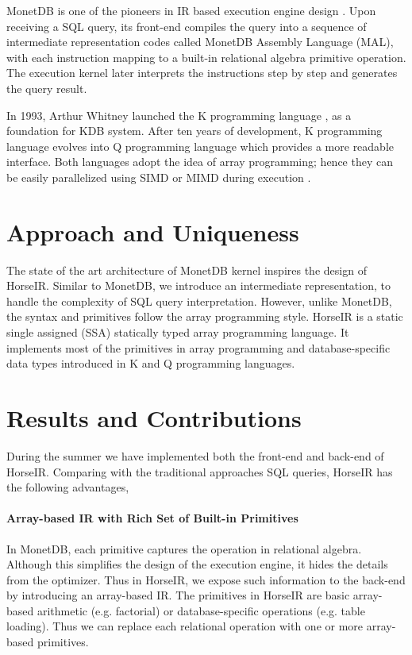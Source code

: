 \documentclass[sigplan]{acmart}
\begin{document}
MonetDB is one of the pioneers in IR based execution engine design
\cite{DBLP:journals/debu/IdreosGNMMK12}. Upon receiving a SQL query, its
front-end compiles the query into a sequence of intermediate representation
codes called MonetDB Assembly Language (MAL), with each instruction mapping to
a built-in relational algebra primitive operation. The execution kernel later
interprets the instructions step by step and generates the query result.

In 1993, Arthur Whitney launched the K programming language
\cite{KLangTutorial} , as a foundation for KDB system. After ten years of
development, K programming language evolves into Q programming language
\cite{QLangTutorial} which provides a more readable interface. Both languages
adopt the idea of array programming; hence they can be easily parallelized
using SIMD or MIMD during execution \cite{HowFastCanAPLBe}. 


\section{Approach and Uniqueness}

The state of the art architecture of MonetDB kernel inspires the design of
HorseIR. Similar to MonetDB, we introduce an intermediate representation, to
handle the complexity of SQL query interpretation.  However, unlike MonetDB,
the syntax and primitives follow the array programming style. HorseIR is a
static single assigned (SSA) statically typed array programming language. It
implements most of the primitives in array programming and database-specific
data types introduced in K and Q programming languages.

\section{Results and Contributions}

During the summer we have implemented both the front-end and back-end of
HorseIR. Comparing with the traditional approaches  SQL queries, HorseIR has
the following advantages,

\paragraph{Array-based IR with Rich Set of Built-in Primitives}
In MonetDB, each primitive captures the operation in relational algebra.
Although this simplifies the design of the execution engine, it hides the
details from the optimizer. Thus in HorseIR, we expose such information to the
back-end by introducing an array-based IR. The primitives in HorseIR are basic
array-based arithmetic (e.g. factorial) or database-specific operations (e.g. table loading).
Thus we can replace each relational operation with one or more
array-based primitives. 
\end{document}
